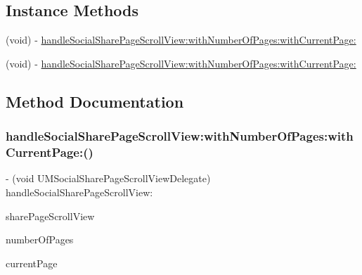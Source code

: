 \subsection*{Instance Methods}
\begin{DoxyCompactItemize}
\item 
(void) -\/ \mbox{\hyperlink{protocol_u_m_social_share_page_scroll_view_delegate_01-p_af5f68332837a7b7370344f8bf2f3a6ea}{handle\+Social\+Share\+Page\+Scroll\+View\+:with\+Number\+Of\+Pages\+:with\+Current\+Page\+:}}
\item 
(void) -\/ \mbox{\hyperlink{protocol_u_m_social_share_page_scroll_view_delegate_01-p_af5f68332837a7b7370344f8bf2f3a6ea}{handle\+Social\+Share\+Page\+Scroll\+View\+:with\+Number\+Of\+Pages\+:with\+Current\+Page\+:}}
\end{DoxyCompactItemize}


\subsection{Method Documentation}
\mbox{\label{protocol_u_m_social_share_page_scroll_view_delegate_01-p_af5f68332837a7b7370344f8bf2f3a6ea}} 
\subsubsection{\texorpdfstring{handle\+Social\+Share\+Page\+Scroll\+View\+:with\+Number\+Of\+Pages\+:with\+Current\+Page\+:()}{handleSocialSharePageScrollView:withNumberOfPages:withCurrentPage:()}\hspace{0.1cm}{\footnotesize\ttfamily [1/2]}}
{\footnotesize\ttfamily -\/ (void U\+M\+Social\+Share\+Page\+Scroll\+View\+Delegate) handle\+Social\+Share\+Page\+Scroll\+View\+: \begin{DoxyParamCaption}\item[{(U\+M\+Social\+Share\+Page\+Scroll\+View $\ast$)}]{share\+Page\+Scroll\+View }\item[{withNumberOfPages:(N\+S\+Integer)}]{number\+Of\+Pages }\item[{withCurrentPage:(N\+S\+Integer)}]{current\+Page }\end{DoxyParamCaption}\hspace{0.3cm}{\ttfamily [optional]}}

